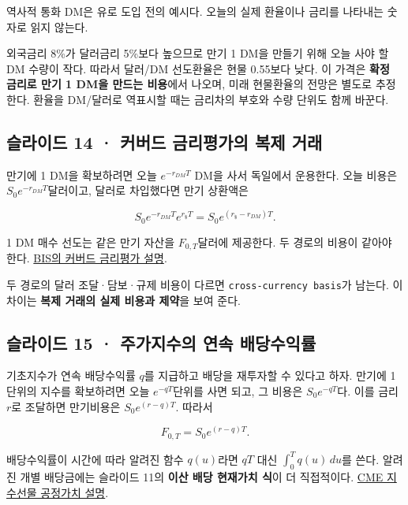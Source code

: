 \documentclass[11pt,a4paper]{article}
\begin{document}
역사적 통화 DM은 유로 도입 전의 예시다. 오늘의 실제 환율이나 금리를 나타내는 숫자로 읽지 않는다.\par

외국금리 8\%가 달러금리 5\%보다 높으므로 만기 1 DM을 만들기 위해 오늘 사야 할 DM 수량이 작다. 따라서 달러/DM 선도환율은 현물 0.55보다 낮다. 이 가격은 \textbf{확정 금리로 만기 1 DM을 만드는 비용}에서 나오며, 미래 현물환율의 전망은 별도로 추정한다. 환율을 DM/달러로 역표시할 때는 금리차의 부호와 수량 단위도 함께 바꾼다.\par

\subsection{슬라이드 14 · 커버드 금리평가의 복제 거래}
만기에 1 DM을 확보하려면 오늘 $e^{-r_{DM}T}$ DM을 사서 독일에서 운용한다. 오늘 비용은 $S_0e^{-r_{DM}T}$달러이고, 달러로 차입했다면 만기 상환액은\par

\[
S_0e^{-r_{DM}T}e^{r_{\$}T}=S_0e^{(r_{\$}-r_{DM})T}.
\]

1 DM 매수 선도는 같은 만기 자산을 $F_{0,T}$달러에 제공한다. 두 경로의 비용이 같아야 한다. \href{https://www.bis.org/publications/qr-201609/covered-interest-parity-lost-understanding-cross-currency-basis}{BIS의 커버드 금리평가 설명}.\par

두 경로의 달러 조달·담보·규제 비용이 다르면 \texttt{cross-currency basis}가 남는다. 이 차이는 \textbf{복제 거래의 실제 비용과 제약}을 보여 준다.\par

\subsection{슬라이드 15 · 주가지수의 연속 배당수익률}
기초지수가 연속 배당수익률 $q$를 지급하고 배당을 재투자할 수 있다고 하자. 만기에 1단위의 지수를 확보하려면 오늘 $e^{-qT}$단위를 사면 되고, 그 비용은 $S_0e^{-qT}$다. 이를 금리 $r$로 조달하면 만기비용은 $S_0e^{(r-q)T}$. 따라서\par

\[
F_{0,T}=S_0e^{(r-q)T}.
\]

배당수익률이 시간에 따라 알려진 함수 $q(u)$라면 $qT$ 대신 $\int_0^Tq(u)\,du$를 쓴다. 알려진 개별 배당금에는 슬라이드 11의 \textbf{이산 배당 현재가치 식}이 더 직접적이다. \href{https://www.cmegroup.com/trading/equity-index/fairvalue.html}{CME 지수선물 공정가치 설명}.\par
\end{document}
